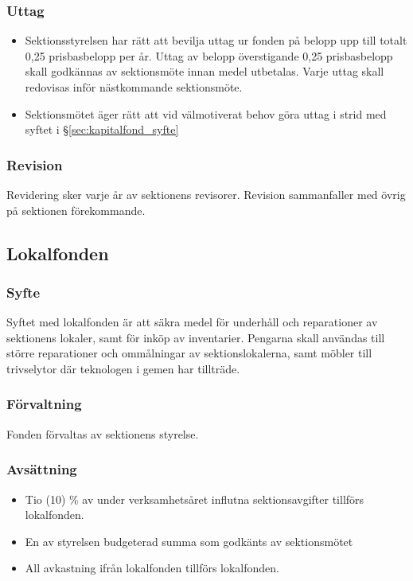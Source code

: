 \documentclass[a4paper, 10pt]{article}
\begin{document}
\subsubsection{Uttag}
\begin{itemize}
\item Sektionsstyrelsen har rätt att bevilja uttag ur fonden på belopp upp till totalt 0,25 prisbasbelopp per år. Uttag av belopp överstigande 0,25 prisbasbelopp skall godkännas av sektionsmöte innan medel utbetalas. Varje uttag skall redovisas inför nästkommande sektionsmöte.
\item Sektionsmötet äger rätt att vid välmotiverat behov göra uttag i strid med syftet i §\ref{sec:kapitalfond_syfte}
\end{itemize}
\subsubsection{Revision}
Revidering sker varje år av sektionens revisorer. Revision sammanfaller med övrig på sektionen förekommande.
\subsection{Lokalfonden}
\subsubsection{Syfte}
\label{sec:lokalfond_syfte}
Syftet med lokalfonden är att säkra medel för underhåll och reparationer av sektionens lokaler, samt för inköp av inventarier. Pengarna skall användas till större reparationer och ommålningar av sektionslokalerna, samt möbler till trivselytor där teknologen i gemen har tillträde.
\subsubsection{Förvaltning}
Fonden förvaltas av sektionens styrelse.
\subsubsection{Avsättning}
\label{sec:lokalfond_avsattning}
\begin{itemize}
\item Tio (10) \% av under verksamhetsåret influtna sektionsavgifter tillförs lokalfonden.
\item En av styrelsen budgeterad summa som godkänts av sektionsmötet
\item All avkastning ifrån lokalfonden tillförs lokalfonden.
\end{itemize}
\end{document}
